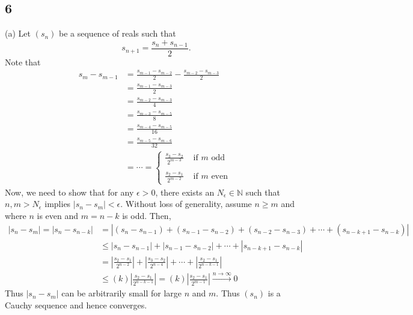 \documentclass[11pt]{amsart}
\begin{document}
\subsection*{6} (a) Let $(s_{n})$ be a sequence of reals such that 
\[ s_{n+1} = \frac{s_{n} + s_{n-1}}{2}.\]
Note that 
\begin{align*}
  s_{m} - s_{m-1} & = \frac{s_{m-1} - s_{m-2}}{2} - \frac{s_{m-2} - s_{m-3}}{2} \\
  & = \frac{s_{m-1} - s_{m-3}}{2} \\
  & = \frac{s_{m-2} - s_{m-3}}{4} \\
  & = \frac{s_{m-3} - s_{m-5}}{8} \\
  & = \frac{s_{m-4} - s_{m-5}}{16} \\
  & = \frac{s_{m-5} - s_{m-6}}{32} \\
  & = \cdots = \left\{ \begin{array}{cl} \frac{s_{3} - s_{2}}{2^{m-3}} & \text{ if } m \text{ odd} \\ \\
    \frac{s_{2} - s_{1}}{2^{m-2}} & \text{ if } m \text{ even }
  \end{array} \right.
\end{align*}
Now, we need to show that for any $\epsilon > 0$, there exists an $N_{\epsilon} \in \mathbb{N}$ such that $n,m > N_{\epsilon}$ implies $|s_{n} - s_{m}| < \epsilon$. Without loss of generality, assume $n \geq m$ and where $n$ is even and $m = n - k$ is odd. Then,
\begin{align*}
  |s_{n} - s_{m}| = |s_{n} - s_{n-k}| & = |(s_{n} - s_{n-1}) + (s_{n-1} - s_{n-2}) + (s_{n-2} - s_{n-3}) + \cdots + (s_{n-k+1} - s_{n-k})| \\
  & \leq |s_{n} - s_{n-1}| + |s_{n-1} - s_{n-2}| + \cdots + |s_{n-k+1} - s_{n-k}| \\
  & = \left| \frac{s_{2} - s_{1}}{2^{n-2}}\right| + \left| \frac{s_{3} - s_{2}}{2^{n-4}}\right| + \cdots + \left| \frac{s_{2} - s_{1}}{2^{n-k-1}}\right| \\
  & \leq (k) \left| \frac{s_{2} - s_{1}}{2^{n-k-1}}\right| = (k) \left| \frac{s_{2} - s_{1}}{2^{m-1}}\right| \stackrel{n\rightarrow \infty}{\longrightarrow} 0
\end{align*}
Thus $|s_{n} - s_{m}|$ can be arbitrarily small for large $n$ and $m$. Thus $(s_{n})$ is a Cauchy sequence and hence converges. \\
\end{document}
